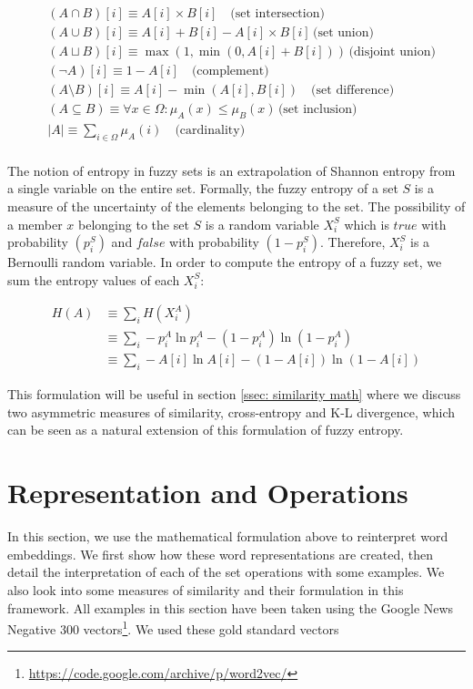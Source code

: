 \documentclass[11pt]{book}
\newcommand{\card}[1]{\left| #1 \right|}
\begin{document}
\begin{align*} &(A \cap B)[i] \equiv  A[i] \times B[i] \quad
\text{(set intersection)} \\ &(A \cup B)[i] \equiv  A[i] + B[i]  - A[i] \times
B[i] \, \text{(set union)}\\ &(A \sqcup B)[i] \equiv  \max(1, \min(0, A[i] +
B[i])) \, \text{(disjoint union)}\\ &(\lnot A)[i] \equiv 1 - A[i] \quad
\text{(complement)}\\ &(A \setminus B)[i] \equiv A[i]  - \min(A[i], B[i]) \quad
\text{(set difference)} \\ &(A \subseteq B) \equiv \forall x \in \Omega:
\mu_A(x) \leq \mu_B(x) \, \text{(set inclusion)}\\ &\card A \equiv \sum_{i \in
\Omega} \mu_A (i) \quad \text{(cardinality)} \\
\end{align*}

The notion of entropy in fuzzy sets is an extrapolation of Shannon entropy from
a single variable on the entire set. Formally, the fuzzy entropy of a set $S$
is a measure of the uncertainty of the elements belonging to the set. The
possibility of a member $x$ belonging to the set $S$ is a random variable
$X_i^S$ which is $true$ with probability $(p_i^S)$ and $false$ with probability
$(1-p^S_i)$. Therefore, $X_i^S$ is a Bernoulli random variable. In order to
compute the entropy of a fuzzy set, we sum the entropy values of each $X_i^S$:

\begin{align*} H(A) &\equiv \sum_i H(X^A_i) \\ &\equiv \sum_i
-p_i^A \ln p_i^A - (1 - p_i^A) \ln (1 - p_i^A) \\ &\equiv  \sum_i -A[i] \ln
A[i] - (1 - A[i]) \ln (1 - A[i]) \end{align*}

This formulation will be useful in section \ref{ssec: similarity math} where we
discuss two asymmetric measures of similarity, cross-entropy and K-L
divergence, which can be seen as a natural extension of this formulation of
fuzzy entropy.

\section{Representation and Operations} \label{sec: meat of the paper}

In this section, we use the mathematical formulation above to reinterpret word
embeddings. We first show how these word representations are created, then
detail the interpretation of each of the set operations with some examples. We
also look into some measures of similarity and their formulation in this
framework. All examples in this section have been taken using the Google News
Negative 300
vectors\footnote{\url{https://code.google.com/archive/p/word2vec/}}. We used
these gold standard vectors
\end{document}
